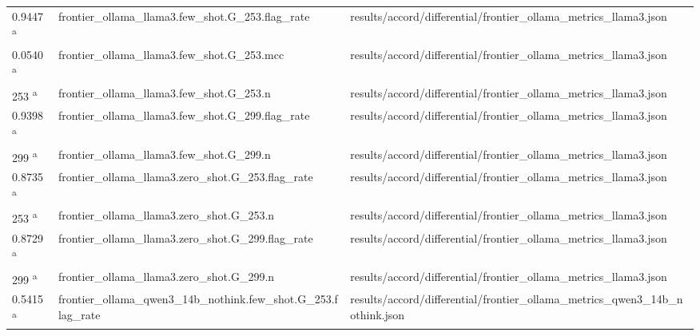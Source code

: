 \begin{longtable}{@{}p{0.7in}p{1.9in}p{2.6in}@{}}
0.9447 \textsuperscript{a} & frontier\_ollama\_llama3.\allowbreak{}few\_shot.\allowbreak{}G\_253.\allowbreak{}flag\_rate & results/\allowbreak{}accord/\allowbreak{}differential/\allowbreak{}frontier\_ollama\_metrics\_llama3.\allowbreak{}json\\
0.0540 \textsuperscript{a} & frontier\_ollama\_llama3.\allowbreak{}few\_shot.\allowbreak{}G\_253.\allowbreak{}mcc & results/\allowbreak{}accord/\allowbreak{}differential/\allowbreak{}frontier\_ollama\_metrics\_llama3.\allowbreak{}json\\
253 \textsuperscript{a} & frontier\_ollama\_llama3.\allowbreak{}few\_shot.\allowbreak{}G\_253.\allowbreak{}n & results/\allowbreak{}accord/\allowbreak{}differential/\allowbreak{}frontier\_ollama\_metrics\_llama3.\allowbreak{}json\\
0.9398 \textsuperscript{a} & frontier\_ollama\_llama3.\allowbreak{}few\_shot.\allowbreak{}G\_299.\allowbreak{}flag\_rate & results/\allowbreak{}accord/\allowbreak{}differential/\allowbreak{}frontier\_ollama\_metrics\_llama3.\allowbreak{}json\\
299 \textsuperscript{a} & frontier\_ollama\_llama3.\allowbreak{}few\_shot.\allowbreak{}G\_299.\allowbreak{}n & results/\allowbreak{}accord/\allowbreak{}differential/\allowbreak{}frontier\_ollama\_metrics\_llama3.\allowbreak{}json\\
0.8735 \textsuperscript{a} & frontier\_ollama\_llama3.\allowbreak{}zero\_shot.\allowbreak{}G\_253.\allowbreak{}flag\_rate & results/\allowbreak{}accord/\allowbreak{}differential/\allowbreak{}frontier\_ollama\_metrics\_llama3.\allowbreak{}json\\
253 \textsuperscript{a} & frontier\_ollama\_llama3.\allowbreak{}zero\_shot.\allowbreak{}G\_253.\allowbreak{}n & results/\allowbreak{}accord/\allowbreak{}differential/\allowbreak{}frontier\_ollama\_metrics\_llama3.\allowbreak{}json\\
0.8729 \textsuperscript{a} & frontier\_ollama\_llama3.\allowbreak{}zero\_shot.\allowbreak{}G\_299.\allowbreak{}flag\_rate & results/\allowbreak{}accord/\allowbreak{}differential/\allowbreak{}frontier\_ollama\_metrics\_llama3.\allowbreak{}json\\
299 \textsuperscript{a} & frontier\_ollama\_llama3.\allowbreak{}zero\_shot.\allowbreak{}G\_299.\allowbreak{}n & results/\allowbreak{}accord/\allowbreak{}differential/\allowbreak{}frontier\_ollama\_metrics\_llama3.\allowbreak{}json\\
0.5415 \textsuperscript{a} & frontier\_ollama\_qwen3\_14b\_nothink.\allowbreak{}few\_shot.\allowbreak{}G\_253.\allowbreak{}flag\_rate & results/\allowbreak{}accord/\allowbreak{}differential/\allowbreak{}frontier\_ollama\_metrics\_qwen3\_14b\_nothink.\allowbreak{}json\\

\end{longtable}
